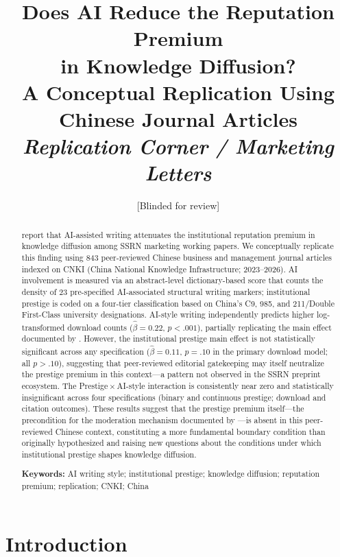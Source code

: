 \documentclass[12pt,a4paper]{article}
\title{\textbf{Does AI Reduce the Reputation Premium\\
in Knowledge Diffusion?\\
A Conceptual Replication Using Chinese Journal Articles}\\[0.8em]
\large\textit{Replication Corner / Marketing Letters}}
\author{[Blinded for review]}
\date{}
\begin{document}
\maketitle

\begin{abstract}
\noindent
\citet{JoLi2026} report that AI-assisted writing attenuates the
institutional reputation premium in knowledge diffusion among SSRN
marketing working papers.
We conceptually replicate this finding using 843 peer-reviewed Chinese
business and management journal articles indexed on CNKI
(China National Knowledge Infrastructure; 2023--2026).
AI involvement is measured via an abstract-level dictionary-based score
that counts the density of 23 pre-specified AI-associated structural
writing markers; institutional prestige is coded on a four-tier
classification based on China's C9, 985, and 211/Double First-Class
university designations.
AI-style writing independently predicts higher log-transformed download
counts ($\hat{\beta}=0.22$, $p<.001$), partially replicating the main
effect documented by \citet{JoLi2026}.
However, the institutional prestige main effect is not statistically
significant across any specification ($\hat{\beta}=0.11$, $p=.10$
in the primary download model; all $p>.10$), suggesting that peer-reviewed
editorial gatekeeping may itself neutralize the prestige premium in this
context---a pattern not observed in the SSRN preprint ecosystem.
The Prestige\,$\times$\,AI-style interaction is consistently
near zero and statistically insignificant across four specifications
(binary and continuous prestige; download and citation outcomes).
These results suggest that the prestige premium itself---the precondition
for the moderation mechanism documented by \citet{JoLi2026}---is absent
in this peer-reviewed Chinese context, constituting a more fundamental
boundary condition than originally hypothesized and raising new questions
about the conditions under which institutional prestige shapes knowledge
diffusion.

\smallskip\noindent
\textbf{Keywords:} AI writing style; institutional prestige; knowledge
diffusion; reputation premium; replication; CNKI; China
\end{abstract}

\newpage

\section{Introduction}
\label{sec:intro}
\end{document}

